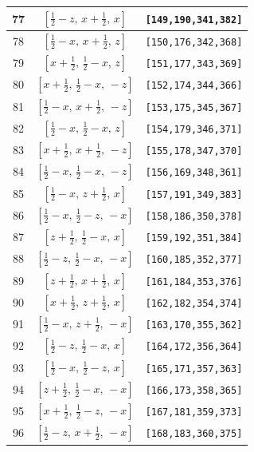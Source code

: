 \documentclass[fleqn,8pt]{jsarticle}
\begin{document}
\begin{longtable}{ccc}
77 & $\left[ \frac{1}{2} - z,\, x + \frac{1}{2},\, x \right]$ & {\tt [149,190,341,382]} \\ \hline
78 & $\left[ \frac{1}{2} - x,\, x + \frac{1}{2},\, z \right]$ & {\tt [150,176,342,368]} \\ \hline
79 & $\left[ x + \frac{1}{2},\, \frac{1}{2} - x,\, z \right]$ & {\tt [151,177,343,369]} \\ \hline
80 & $\left[ x + \frac{1}{2},\, \frac{1}{2} - x,\, - z \right]$ & {\tt [152,174,344,366]} \\ \hline
81 & $\left[ \frac{1}{2} - x,\, x + \frac{1}{2},\, - z \right]$ & {\tt [153,175,345,367]} \\ \hline
82 & $\left[ \frac{1}{2} - x,\, \frac{1}{2} - x,\, z \right]$ & {\tt [154,179,346,371]} \\ \hline
83 & $\left[ x + \frac{1}{2},\, x + \frac{1}{2},\, - z \right]$ & {\tt [155,178,347,370]} \\ \hline
84 & $\left[ \frac{1}{2} - x,\, \frac{1}{2} - x,\, - z \right]$ & {\tt [156,169,348,361]} \\ \hline
85 & $\left[ \frac{1}{2} - x,\, z + \frac{1}{2},\, x \right]$ & {\tt [157,191,349,383]} \\ \hline
86 & $\left[ \frac{1}{2} - x,\, \frac{1}{2} - z,\, - x \right]$ & {\tt [158,186,350,378]} \\ \hline
87 & $\left[ z + \frac{1}{2},\, \frac{1}{2} - x,\, x \right]$ & {\tt [159,192,351,384]} \\ \hline
88 & $\left[ \frac{1}{2} - z,\, \frac{1}{2} - x,\, - x \right]$ & {\tt [160,185,352,377]} \\ \hline
89 & $\left[ z + \frac{1}{2},\, x + \frac{1}{2},\, x \right]$ & {\tt [161,184,353,376]} \\ \hline
90 & $\left[ x + \frac{1}{2},\, z + \frac{1}{2},\, x \right]$ & {\tt [162,182,354,374]} \\ \hline
91 & $\left[ \frac{1}{2} - x,\, z + \frac{1}{2},\, - x \right]$ & {\tt [163,170,355,362]} \\ \hline
92 & $\left[ \frac{1}{2} - z,\, \frac{1}{2} - x,\, x \right]$ & {\tt [164,172,356,364]} \\ \hline
93 & $\left[ \frac{1}{2} - x,\, \frac{1}{2} - z,\, x \right]$ & {\tt [165,171,357,363]} \\ \hline
94 & $\left[ z + \frac{1}{2},\, \frac{1}{2} - x,\, - x \right]$ & {\tt [166,173,358,365]} \\ \hline
95 & $\left[ x + \frac{1}{2},\, \frac{1}{2} - z,\, - x \right]$ & {\tt [167,181,359,373]} \\ \hline
96 & $\left[ \frac{1}{2} - z,\, x + \frac{1}{2},\, - x \right]$ & {\tt [168,183,360,375]} \\
\end{longtable}
\end{document}
